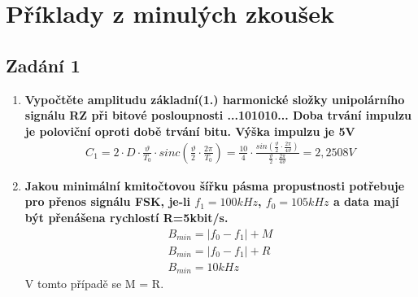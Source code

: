 \clearpage
\section{Příklady z minulých zkoušek}
\subsection{Zadání 1}
\begin{enumerate}
    \item \textbf{Vypočtěte amplitudu základní(1.) harmonické složky unipolárního signálu RZ při bitové posloupnosti ...101010... Doba trvání impulzu je poloviční oproti době trvání bitu. Výška impulzu je 5V}
    \begin{align*}
        C_1 = 2\cdot D \cdot \frac{\vartheta}{T_0}\cdot sinc(\frac{\vartheta}{2}\cdot\frac{2\pi}{T_0}) = \frac{10}{4} \cdot \frac{sin(\frac{\vartheta}{2}\cdot\frac{2\pi}{4\vartheta})}{\frac{\vartheta}{2}\cdot\frac{2\pi}{4\vartheta}} =  2,2508V
    \end{align*}
    \item \textbf{Jakou minimální kmitočtovou šířku pásma propustnosti potřebuje pro přenos signálu FSK, je-li \(f_1 = 100 kHz\), \(f_0 = 105 kHz\) a data mají být přenášena rychlostí R=5kbit/s.}
    \begin{align*}
        B_{min} = \left | f_0 - f_1 \right | + M \\
        B_{min} = \left | f_0 - f_1 \right | + R \\ 
        B_{min} = 10kHz
    \end{align*}
    V tomto případě se M = R. 
    

\end{enumerate}
